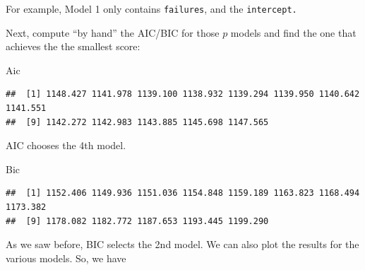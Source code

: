 \documentclass[
]{book}
\newenvironment{Shaded}{\begin{snugshade}}{\end{snugshade}}
\newcommand{\AttributeTok}[1]{\textcolor[rgb]{0.13,0.29,0.53}{#1}}
\newcommand{\DecValTok}[1]{\textcolor[rgb]{0.00,0.00,0.81}{#1}}
\newcommand{\FunctionTok}[1]{\textcolor[rgb]{0.13,0.29,0.53}{\textbf{#1}}}
\newcommand{\NormalTok}[1]{#1}
\newcommand{\OtherTok}[1]{\textcolor[rgb]{0.56,0.35,0.01}{#1}}
\newcommand{\SpecialCharTok}[1]{\textcolor[rgb]{0.81,0.36,0.00}{\textbf{#1}}}
\begin{document}
For example, Model 1 only contains \texttt{failures}, and the \texttt{intercept.}

Next, compute ``by hand'' the AIC/BIC for those \(p\) models and find the one that achieves the the smallest score:

\begin{Shaded}
\end{Shaded}

\begin{Shaded}
\begin{Highlighting}[]
\NormalTok{Aic}
\end{Highlighting}
\end{Shaded}

\begin{verbatim}
##  [1] 1148.427 1141.978 1139.100 1138.932 1139.294 1139.950 1140.642 1141.551
##  [9] 1142.272 1142.983 1143.885 1145.698 1147.565
\end{verbatim}

AIC chooses the 4th model.

\begin{Shaded}
\begin{Highlighting}[]
\NormalTok{Bic}
\end{Highlighting}
\end{Shaded}

\begin{verbatim}
##  [1] 1152.406 1149.936 1151.036 1154.848 1159.189 1163.823 1168.494 1173.382
##  [9] 1178.082 1182.772 1187.653 1193.445 1199.290
\end{verbatim}

As we saw before, BIC selects the 2nd model.
We can also plot the results for the various models. So, we have
\end{document}
